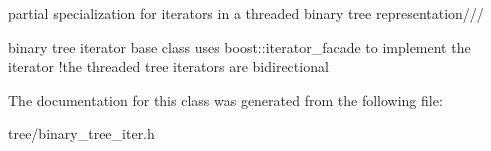 partial specialization for iterators in a threaded binary tree representation/// 

binary tree iterator base class uses boost\-::iterator\-\_\-facade to implement the iterator !the threaded tree iterators are bidirectional 

The documentation for this class was generated from the following file\-:\begin{DoxyCompactItemize}
\item 
tree/binary\-\_\-tree\-\_\-iter.\-h\end{DoxyCompactItemize}
